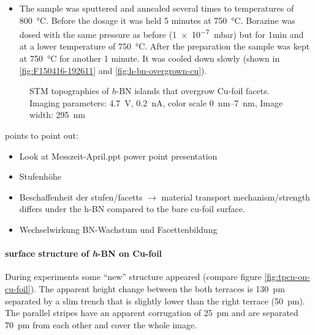 \begin{itemize}
	\item The sample was sputtered and annealed several times to temperatures of \SI{800}{\celsius}. Before the dosage it was held 5 minutes at \SI{750}{\celsius}. Borazine was dosed with the same pressure as before (\SI{1e-7}{\milli \bar}) but for 1min and at a lower temperature of \SI{750}{\celsius}. After the preparation the sample was kept at \SI{750}{\celsius} for another 1 minute. It was cooled down slowly (shown in \autoref{fig:F150416-192611} and \autoref{fig:h-bn-overgrown-cu}).
\end{itemize} 
\begin{figure}
	\centering
	 \quad %
	\caption{STM topographies of \textit{h}-BN islands that overgrow Cu-foil facets. Imaging parameters: 		
\SI{4.7}{\volt}, \SI{0.2}{\nano\ampere}, color scale \SIrange{0}{7}{\nano\meter}, Image width: \SI{295}{\nano \meter}
	}%
	\label{fig:h-bn-overgrown-cu}
\end{figure}
points to point out:
\begin{itemize}
 \item Look at Messzeit-April.ppt power point presentation
 \item Stufenh\"ohe
 \item Beschaffenheit der stufen/facetts $\rightarrow$ material transport mechanism/strength differs under the h-BN compared to the bare cu-foil surface.
 \item Wechselwirkung BN-Wachstum und Facettenbildung
\end{itemize}


\paragraph{surface structure of \textit{h}-BN on Cu-foil}
During experiments some ``new'' structure appeared (compare figure \ref{fig:tpcn-on-cu-foil}).
The apparent height change between the both terraces is \SI{130}{\pico \meter} separated by a slim trench that is slightly lower than the right terrace (\SI{50}{\pico \meter}). The parallel stripes have an apparent corrugation of \SI{25}{\pico \meter} and are separated \SI{70}{\pico \meter} from each other and cover the whole image. 

